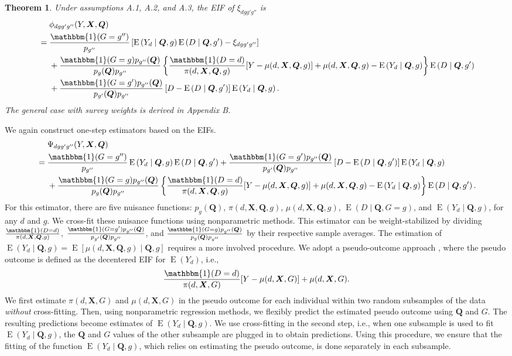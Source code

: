 \documentclass[12pt,a4paper]{article}
\newtheorem{prop}{Theorem}
\newcommand{\E}{\operatorname{E}}
\def\X{{\boldsymbol X}}
\def\Q{{\boldsymbol Q}}
\def\one{\mathbbm{1}}
\begin{document}
\begin{prop}
Under assumptions A.1, A.2, and A.3, the EIF of $\xi_{dgg'g''}$ is 
\begin{align*}
     &\phantom{{}={}} \phi_{dgg'g''}(Y,\X,\Q) \\
    &=\frac{\one(G=g'')}{p_{g''}} \left[ \E \left(Y_d \mid \Q, g \right) \E \left(D \mid \Q, g' \right) - \xi_{dgg'g''} \right] \\
    &\phantom{{}={}} + \frac{\one(G=g) p_{g''}(\Q)}{p_g(\Q)p_{g''}} \left\{ \frac{\one(D=d)}{\pi(d,\X,\Q,g)} [Y-\mu(d,\X,\Q,g)]+\mu(d,\X,\Q,g) - \E \left(Y_d \mid \Q,g \right) \right\} \E \left(D \mid \Q,g' \right) \\
    &\phantom{{}={}} + \frac{\one(G=g')p_{g''}(\Q)}{p_{g'}(\Q)p_{g''}} \left[ D-\E \left(D \mid \Q, g' \right) \right] \E\left( Y_d \mid \Q, g \right).
\end{align*}
The general case with survey weights is derived in Appendix B.
\end{prop}
We again construct one-step estimators based on the EIFs. 
\begin{align*}
    &\phantom{{}={}} \Psi_{dgg'g''}(Y,\X,\Q) \\
    &=\frac{\one(G=g'')}{p_{g''}} \E \left(Y_d \mid \Q, g \right) \E \left(D \mid \Q, g' \right) + \frac{\one(G=g')p_{g''}(\Q)}{p_{g'}(\Q)p_{g''}} \left[ D-\E \left(D \mid \Q, g' \right) \right] \E\left( Y_d \mid \Q, g \right) \\
    &\phantom{{}={}} + \frac{\one(G=g) p_{g''}(\Q)}{p_g(\Q)p_{g''}} \left\{ \frac{\one(D=d)}{\pi(d,\X,\Q,g)} [Y-\mu(d,\X,\Q,g)]+\mu(d,\X,\Q,g) - \E \left(Y_d \mid \Q,g \right) \right\} \E \left(D \mid \Q,g' \right).
\end{align*}
For this estimator, there are five nuisance functions: $p_g(\Q)$, $\pi(d,\X,\Q,g)$, $\mu(d,\X,\Q,g)$, $\E(D \mid \Q, G=g)$, and $\E(Y_d \mid \Q,g)$, for any $d$ and $g$. We cross-fit these nuisance functions using nonparametric methods. This estimator can be weight-stabilized by dividing $\frac{\one(D=d)}{\pi(d,\X,\Q,g)}$, $\frac{\one(G=g')p_{g''}(\Q)}{p_{g'}(\Q)p_{g''}}$, and $\frac{\one(G=g)p_{g''}(\Q)}{p_g(\Q)p_{g''}}$ by their respective sample averages. The estimation of $\E(Y_d \mid \Q,g)=\E[\mu(d,\X,\Q,g) \mid \Q,g]$ requires a more involved procedure. We adopt a pseudo-outcome approach \citep[e.g.,][]{van_der_laan_statistical_2006,semenova_debiased_2021}, where the pseudo outcome is defined as the decentered EIF for $\E(Y_d)$, i.e., 
$$ \frac{\one(D=d)}{\pi(d, \X,G)} [Y-\mu(d,\X,G)] + \mu(d,\X,G).$$
We first estimate $\pi(d, \X,G)$ and $\mu(d,\X,G)$ in the pseudo outcome for each individual within two random subsamples of the data \emph{without} cross-fitting. Then, using nonparametric regression methods, we flexibly predict the estimated pseudo outcome using $\Q$ and $G$. The resulting predictions become estimates of $\E(Y_d \mid \Q,g)$. We use cross-fitting in the second step, i.e., when one subsample is used to fit $\E(Y_d \mid \Q,g)$, the $\Q$ and $G$ values of the other subsample are plugged in to obtain predictions. Using this procedure, we ensure that the fitting of the function $\E(Y_d \mid \Q,g)$, which relies on estimating the pseudo outcome, is done separately in each subsample. 
\end{document}
